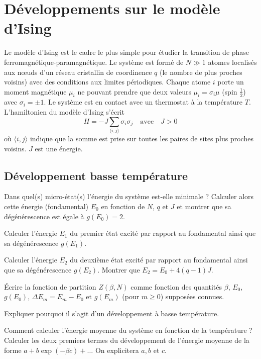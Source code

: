 \documentclass[utf8, 11pt]{feuille}
\begin{document}
\section{Développements sur le modèle d'Ising}
Le modèle d'Ising est le cadre le plus simple pour étudier la transition de phase ferromagnétique-paramagnétique. Le système est formé de $N \gg 1$ atomes localisés aux n\oe uds d'un réseau cristallin de coordinence $q$ (le nombre de plus proches voisins) avec des conditions aux limites périodiques. Chaque atome $i$ porte un moment magnétique $\mu_i$ ne pouvant prendre que deux valeurs $\mu_i=\sigma_i \mu$ (spin $\frac{1}{2}$) avec $\sigma_i= \pm 1$. Le système est en contact avec un thermostat à la température $T$. L'hamiltonien du modèle d'Ising s'écrit
$$
H=-J\sum_{\langle i,j \rangle}\sigma_i \sigma_j  \quad \textrm{avec} \quad J>0
$$
où ${\langle i,j\rangle}$ indique que la somme est prise sur toutes les paires de sites plus proches voisins. $J$ est une énergie.

\subsection{Développement basse température}
\question Dans quel(s) micro-état(s) l'énergie du système est-elle minimale ? Calculer alors cette énergie (fondamental) $E_0$ en fonction de $N$, $q$ et $J$ et montrer que sa dégénérescence est égale à $g(E_0)=2$.

\question Calculer l'énergie $E_1$ du premier état excité par rapport au fondamental ainsi que sa dégénérescence $g(E_1)$.

\question Calculer l'énergie $E_2$ du deuxième état excité par rapport au fondamental ainsi que sa dégénérescence $g(E_2)$. Montrer que $E_2=E_0+4(q-1)J$.

\question  \'Ecrire la fonction de partition $Z(\beta,N)$ comme fonction des quantités $\beta$, $E_0$, $g(E_0)$, $\Delta E_m=E_m-E_0$ et $g(E_m)$ (pour $m \ge 0$) supposées connues.

\question Expliquer pourquoi il s'agit d'un développement à basse température.

\question Comment calculer l'énergie moyenne du système en fonction de la température ? Calculer les deux premiers termes du développement de l'énergie moyenne de la forme $a+b\exp (-\beta c)+ \ldots$ On explicitera $a, b$ et $c$.

\end{document}
